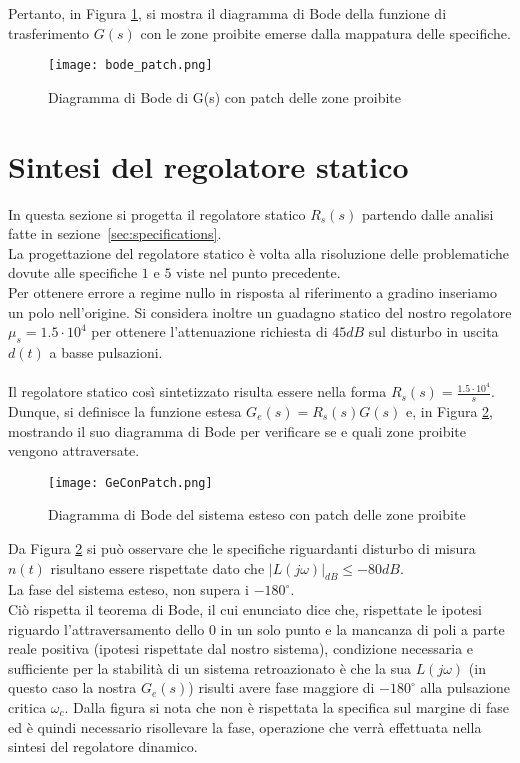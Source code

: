 \documentclass[a4paper, 11pt]{article}
\begin{document}
\clearpage
Pertanto, in Figura \ref{bodepatch}, si mostra il diagramma di Bode della funzione di trasferimento $G(s)$ con le zone proibite emerse dalla mappatura delle specifiche.

\begin{figure}[h!]
    \centering
    \texttt{[image: bode\_patch.png]}
    \caption{Diagramma di Bode di G(s) con patch delle zone proibite}
	\label{bodepatch}
\end{figure}

\clearpage
\section{Sintesi del regolatore statico}
\label{sec:static_regulator}


In questa sezione si progetta il regolatore statico $R_s(s)$ partendo dalle analisi fatte in sezione~\ref{sec:specifications}.\\
La progettazione del regolatore statico è volta alla risoluzione delle problematiche dovute alle specifiche $1$ e $5$ viste nel punto precedente.\\
Per ottenere errore a regime nullo in risposta al riferimento a gradino inseriamo un polo nell'origine. Si considera inoltre un guadagno statico del nostro regolatore $\mu_s=1.5 \cdot 10^4$ per ottenere l'attenuazione richiesta di $45dB$ sul disturbo in uscita $d(t)$ a basse pulsazioni.
\\
\\
Il regolatore statico così sintetizzato risulta essere nella forma $R_s(s)=\frac{1.5 \cdot 10^4}{s}$.\\

Dunque, si definisce la funzione estesa $G_e(s) = R_s(s)G(s)$ e, in Figura \ref{geconpatch}, mostrando il suo diagramma di Bode per verificare se e quali zone proibite vengono attraversate.

\begin{figure}[h!]
    \centering
    \texttt{[image: GeConPatch.png]}
    \caption{Diagramma di Bode del sistema esteso con patch delle zone proibite}
    \label{geconpatch}
\end{figure}


Da Figura \ref{geconpatch} si può osservare che le specifiche riguardanti disturbo di misura $n(t)$ risultano essere rispettate dato che $|L(j\omega)|_{dB}\le-80dB$. \\
La fase del sistema esteso, non supera i $-180^{\circ}$.\\
Ciò rispetta il teorema di Bode, il cui enunciato dice che, rispettate le ipotesi riguardo l'attraversamento dello 0 in un solo punto e la mancanza di poli a parte reale positiva (ipotesi rispettate dal nostro sistema), condizione necessaria e sufficiente per la stabilità di un sistema retroazionato è che la sua $L(j\omega)$ (in questo caso la nostra $G_e(s)$) risulti avere fase maggiore di $-180^{\circ}$ alla pulsazione critica $\omega_c$.
Dalla figura si nota che non è rispettata la specifica sul margine di fase
ed è quindi necessario risollevare la fase, operazione che verrà effettuata nella sintesi del regolatore dinamico. 
\end{document}
